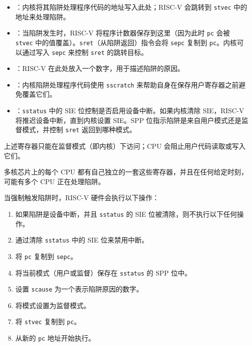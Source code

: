 \begin{itemize}

\item {}：内核将其陷阱处理程序代码的地址写入此处；RISC-V 会跳转到 {\tt stvec} 中的地址来处理陷阱。

\item {}：当陷阱发生时，RISC-V 将程序计数器保存到这里（因为此时 {\tt pc} 会被 {\tt stvec} 中的值覆盖）。{\tt sret}（从陷阱返回）指令会将 {\tt sepc} 复制到 {\tt pc}。内核可以通过写入 {\tt sepc} 来控制 {\tt sret} 的跳转目标。

\item {}：RISC-V 在此处放入一个数字，用于描述陷阱的原因。

\item {}：内核陷阱处理程序代码使用 {\tt sscratch} 来帮助自身在保存用户寄存器之前避免覆盖它们。

\item {}：{\tt sstatus} 中的 SIE 位控制是否启用设备中断。如果内核清除 SIE，RISC-V 将推迟设备中断，直到内核设置 SIE。SPP 位指示陷阱是来自用户模式还是监督模式，并控制 {\tt sret} 返回到哪种模式。

\end{itemize}

上述寄存器只能在监督模式（即内核）下访问；CPU 会阻止用户代码读取或写入它们。

多核芯片上的每个 CPU 都有自己独立的一套这些寄存器，并且在任何给定时刻，可能有多个 CPU 正在处理陷阱。

当强制触发陷阱时，RISC-V 硬件会执行以下操作：

\begin{enumerate}

\item 如果陷阱是设备中断，并且 {\tt sstatus} 的 SIE 位被清除，则不执行以下任何操作。

\item 通过清除 {\tt sstatus} 中的 SIE 位来禁用中断。

\item 将 {\tt pc} 复制到 {\tt sepc}。

\item 将当前模式（用户或监督）保存在 {\tt sstatus} 的 SPP 位中。

\item 设置 {\tt scause} 为一个表示陷阱原因的数字。

\item 将模式设置为监督模式。

\item 将 {\tt stvec} 复制到 {\tt pc}。

\item 从新的 {\tt pc} 地址开始执行。

\end{enumerate}

